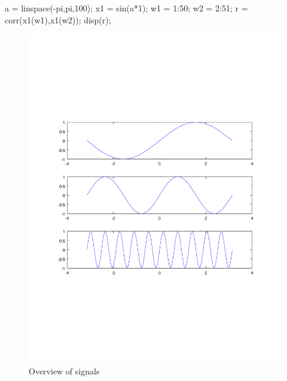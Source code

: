 \begin{Matlab}
a = linspace(-pi,pi,100); %
x1  = sin(a*1); %
w1 = 1:50;
w2 = 2:51;
r = corr(x1(w1),x1(w2));
disp(r);
\end{Matlab}

\begin{figure}
\centering
\includegraphics[scale=0.4]{Figures/overview}
\caption{Overview of signals}
\label{fig:overview}
\end{figure}



